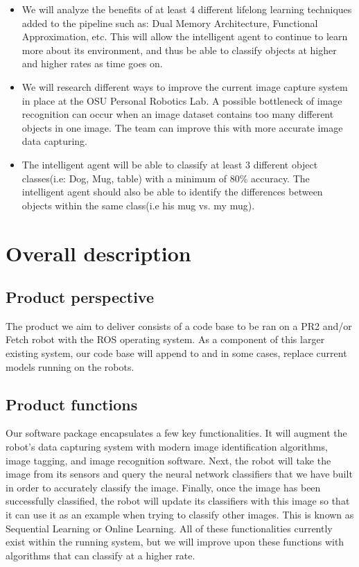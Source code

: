 \documentclass[draftclsnofoot, onecolumn, 10pt, compsoc]{IEEEtran}
\begin{document}
		\begin{itemize}
			\item We will analyze the benefits of at least 4 different lifelong learning techniques added to the pipeline such as: Dual Memory Architecture, Functional Approximation, etc. This will allow the intelligent agent to continue to learn more about its environment, and thus be able to classify objects at higher and higher rates as time goes on.
			\item We will research different ways to improve the current image capture system in place at the OSU Personal Robotics Lab. A possible bottleneck of image recognition can occur when an image dataset contains too many different objects in one image. The team can improve this with more accurate image data capturing.
			\item The intelligent agent will be able to classify at least 3 different object classes(i.e: Dog, Mug, table) with a minimum of 80\% accuracy. The intelligent agent should also be able to identify the differences between objects within the same class(i.e his mug vs. my mug).
		\end{itemize}

\section{Overall description}
	\subsection{Product perspective}
		The product we aim to deliver consists of a code base to be ran on a PR2 and/or Fetch robot with the ROS operating system. As a component of this larger existing system, our code base will append to and in some cases, replace current models running on the robots.
	
	\subsection{Product functions}
		Our software package encapsulates a few key functionalities. It will augment the robot's data capturing system with modern image identification algorithms, image tagging, and image recognition software. Next, the robot will take the image from its sensors and query the neural network classifiers that we have built in order to accurately classify the image. Finally, once the image has been successfully classified, the robot will update its classifiers with this image so that it can use it as an example when trying to classify other images. This is known as Sequential Learning or Online Learning. All of these functionalities currently exist within the running system, but we will improve upon these functions with algorithms that can classify at a higher rate.
	
\end{document}
